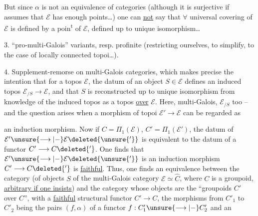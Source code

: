 But since $\alpha$ is not an equivalence of categories (although it is   surjective if  assumes that $\mathcal E$ has enough points\dots) one can \uline{not} say that $\forall$ universal covering of $\mathcal E$ is defined by a poin\textsuperscript{t} of $\mathcal E$, defined up to unique isomorphism\dots



3. ``pro-multi-Galois'' variants, resp. profinite (restricting ourselves, to simplify, to the case of locally connected topoi\dots).

4. Supplement-remorse on multi-Galois categories, which makes precise the intention that for a topos $\mathcal E$, the datum of an object $S\in\mathcal E$ defines an induced topos $\mathcal E_{/S}\longrightarrow\mathcal E$, and that $S$ is reconstructed up to unique isomorphism from knowledge of the induced topos as a topos \uline{over} $\mathcal E$. Here,   multi-Galois, $\mathcal E_{/S}$ too -- and the question arises when a morphism of  topoi $\mathcal E'\longrightarrow\mathcal E$ can be regarded as



an induction morphism. Now if $C=\Pi_1(\mathcal E)$, $C'=\Pi_1(\mathcal E')$, the datum of $\mathcal E'\unsure{\longrightarrow|-}\mathcal E\deleted{\unsure{'}}$ is equivalent to the datum of a functor $C'\longrightarrow C\deleted{'}$. One finds that $\mathcal E'\unsure{\longrightarrow|-}\mathcal E\deleted{\unsure{'}}$ is an induction morphism  $C'\longrightarrow C\deleted{'}$ is \uline{faithful}. Thus, one finds an equivalence between the category  (of objects $S$ of the multi-Galois category $\mathcal E\simeq\widehat C$,  where $C$ is a groupoid, \uline{arbitrary if one insists})
and the category whose objects are the ``groupoids $C'$ over $C$'', with a \uline{faithful} structural functor $C'\longrightarrow C$, the morphisms from $C'_1$ to $C'_2$ being the   pairs $(f,\alpha)$ of a functor $f:C'_1\unsure{\longrightarrow|-}C'_2$ and an



